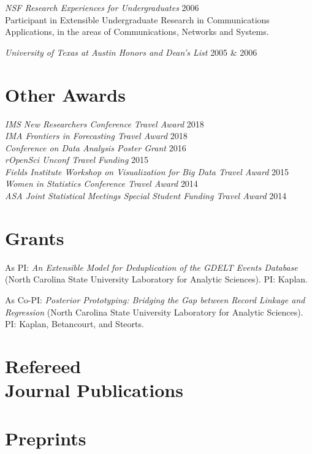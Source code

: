 \documentclass[margin,line]{res}
\begin{document}
\begin{resume}
{\em NSF Research Experiences for Undergraduates } \hfill 2006\\
Participant in Extensible Undergraduate Research in Communications Applications, in the areas of Communications, Networks and Systems.

{\em University of Texas at Austin Honors and Dean's List } \hfill 2005 \& 2006

\section{\sc Other Awards}
{\em IMS New Researchers Conference Travel Award} \hfill 2018\\
{\em IMA Frontiers in Forecasting Travel Award} \hfill 2018\\
{\em Conference on Data Analysis Poster Grant } \hfill 2016\\
{\em rOpenSci Unconf Travel Funding } \hfill 2015\\
{\em Fields Institute Workshop on Visualization for Big Data Travel Award } \hfill 2015\\
{\em Women in Statistics Conference Travel Award } \hfill 2014\\
{\em ASA Joint Statistical Meetings Special Student Funding Travel Award } \hfill 2014

\section{\sc Grants}
As PI: {\em An Extensible Model for Deduplication of the GDELT Events Database} (North Carolina State University Laboratory for Analytic Sciences). PI: Kaplan.

As Co-PI: {\em Posterior Prototyping: Bridging the Gap between Record Linkage and Regression} (North Carolina State University Laboratory for Analytic Sciences). PI: Kaplan, Betancourt, and Steorts.

\section{\sc Refereed \\ Journal Publications}
\printbibliography[keyword=refereed, heading=none, resetnumbers=true]

\section{\sc Preprints}
\printbibliography[keyword=submitted, heading=none, resetnumbers=false]


\end{resume}
\end{document}
